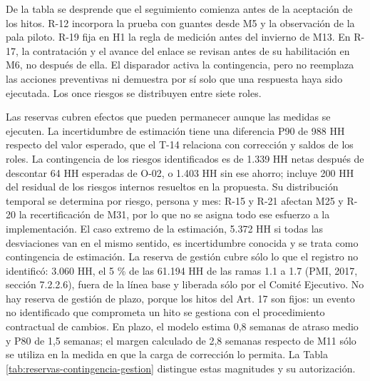 \documentclass[subdoc]{../../comun/overfore}
\begin{document}
De la tabla se desprende que el seguimiento comienza antes de la aceptación de los hitos. R-12 incorpora la prueba con guantes desde M5 y la observación de la pala piloto. R-19 fija en H1 la regla de medición antes del invierno de M13. En R-17, la contratación y el avance del enlace se revisan antes de su habilitación en M6, no después de ella. El disparador activa la contingencia, pero no reemplaza las acciones preventivas ni demuestra por sí solo que una respuesta haya sido ejecutada. Los once riesgos se distribuyen entre siete roles.

Las reservas cubren efectos que pueden permanecer aunque las medidas se ejecuten. La incertidumbre de estimación tiene una diferencia P90 de 988 HH respecto del valor esperado, que el T-14 relaciona con corrección y saldos de los roles. La contingencia de los riesgos identificados es de 1.339 HH netas después de descontar 64 HH esperadas de O-02, o 1.403 HH sin ese ahorro; incluye 200 HH del residual de los riesgos internos resueltos en la propuesta. Su distribución temporal se determina por riesgo, persona y mes: R-15 y R-21 afectan M25 y R-20 la recertificación de M31, por lo que no se asigna todo ese esfuerzo a la implementación. El caso extremo de la estimación, 5.372 HH si todas las desviaciones van en el mismo sentido, es incertidumbre conocida y se trata como contingencia de estimación. La reserva de gestión cubre sólo lo que el registro no identificó: 3.060 HH, el 5 \% de las 61.194 HH de las ramas 1.1 a 1.7 (PMI, 2017, sección 7.2.2.6), fuera de la línea base y liberada sólo por el Comité Ejecutivo. No hay reserva de gestión de plazo, porque los hitos del Art. 17 son fijos: un evento no identificado que comprometa un hito se gestiona con el procedimiento contractual de cambios. En plazo, el modelo estima 0,8 semanas de atraso medio y P80 de 1,5 semanas; el margen calculado de 2,8 semanas respecto de M11 sólo se utiliza en la medida en que la carga de corrección lo permita. La Tabla \ref{tab:reservas-contingencia-gestion} distingue estas magnitudes y su autorización.
\end{document}
